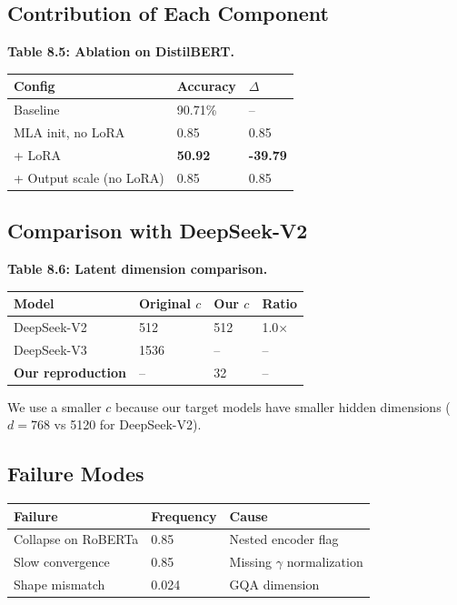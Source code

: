 \subsection{Contribution of Each Component}

\textbf{Table 8.5: Ablation on DistilBERT.}

\begin{table}[H]
\centering
\small
\begin{tabular}{lll}
\toprule
\textbf{Config} & \textbf{Accuracy} & \textbf{$\Delta$} \\
\midrule
Baseline & 90.71\% & -- \\
MLA init, no LoRA & 0.85 & 0.85 \\
+ LoRA & \textbf{50.92} & \textbf{-39.79} \\
+ Output scale (no LoRA) & 0.85 & 0.85 \\
\bottomrule
\end{tabular}
\end{table}

\subsection{Comparison with DeepSeek-V2}

\textbf{Table 8.6: Latent dimension comparison.}

\begin{table}[H]
\centering
\small
\begin{tabular}{llll}
\toprule
\textbf{Model} & \textbf{Original $c$} & \textbf{Our $c$} & \textbf{Ratio} \\
\midrule
DeepSeek-V2 & 512 & 512 & 1.0$\times$ \\
DeepSeek-V3 & 1536 & -- & -- \\
\textbf{Our reproduction} & -- & 32 & -- \\
\bottomrule
\end{tabular}
\end{table}

We use a smaller $c$ because our target models have smaller hidden 
dimensions ($d = 768$ vs 5120 for DeepSeek-V2).

\subsection{Failure Modes}

\begin{table}[H]
\centering
\small
\begin{tabular}{lll}
\toprule
\textbf{Failure} & \textbf{Frequency} & \textbf{Cause} \\
\midrule
Collapse on RoBERTa & 0.85 & Nested encoder flag \\
Slow convergence & 0.85 & Missing $\gamma$ normalization \\
Shape mismatch & 0.024 & GQA dimension \\
\bottomrule
\end{tabular}
\end{table}

